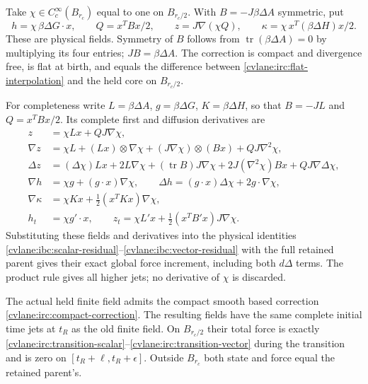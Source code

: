 Take $\chi\in C_c^\infty(B_{r_c})$ equal to one on
$B_{r_c/2}$.  With $B=-J\beta\Delta A$ symmetric, put
\begin{equation}\label{cvlane:irc:compact-correction}
 h=\chi\,\beta\Delta G\cdot x,\qquad
 Q=x^TBx/2,\qquad z=J\nabla(\chi Q),\qquad
 \kappa=\chi\,x^T(\beta\Delta H)x/2.
\end{equation}
These are physical fields.  Symmetry of $B$ follows from
$\operatorname{tr}(\beta\Delta A)=0$ by multiplying its four
entries; $J B=\beta\Delta A$.
The correction is compact and divergence free, is flat at birth,
and equals the difference between \eqref{cvlane:irc:flat-interpolation}
and the held core on $B_{r_c/2}$.

For completeness write $L=\beta\Delta A$, $g=\beta\Delta G$,
$K=\beta\Delta H$, so that $B=-JL$ and $Q=x^TBx/2$.
Its complete first and diffusion derivatives are
\begin{align}
 z&=\chi Lx+QJ\nabla\chi,\nonumber\\
 \nabla z&=\chi L+(Lx)\otimes\nabla\chi
          +(J\nabla\chi)\otimes(Bx)+QJ\nabla^2\chi,
 \label{cvlane:irc:cutoff-gradient}\\
 \Delta z&=(\Delta\chi)Lx+2L\nabla\chi
          +(\operatorname{tr}B)J\nabla\chi
          +2J(\nabla^2\chi)Bx+QJ\nabla\Delta\chi,
 \label{cvlane:irc:cutoff-laplacian}\\
 \nabla h&=\chi g+(g\cdot x)\nabla\chi,\qquad
 \Delta h=(g\cdot x)\Delta\chi+2g\cdot\nabla\chi,\nonumber\\
 \nabla\kappa&=\chi Kx+\tfrac12(x^TKx)\nabla\chi,\nonumber\\
 h_t&=\chi g'\cdot x,\qquad
 z_t=\chi L'x+\tfrac12(x^TB'x)J\nabla\chi.
 \label{cvlane:irc:cutoff-time}
\end{align}
Substituting these fields and derivatives into the physical
identities \eqref{cvlane:ibc:scalar-residual}--\eqref{cvlane:ibc:vector-residual}
with the full retained parent gives their exact global force
increment, including both $d\Delta$ terms.  The product rule
gives all higher jets; no derivative of $\chi$ is discarded.

\begin{cvlaneproposition}\label{cvlane:irc:compact-core-repair}
The actual held finite field admits the compact smooth based
correction \eqref{cvlane:irc:compact-correction}.  The resulting fields
have the same complete initial time jets at $t_R$ as the old
finite field.  On $B_{r_c/2}$ their total force is exactly
\eqref{cvlane:irc:transition-scalar}--\eqref{cvlane:irc:transition-vector}
during the transition and is zero on
$[t_R+\ell,t_R+\epsilon]$.
Outside $B_{r_c}$ both state and force equal the retained parent's.
\end{cvlaneproposition}


